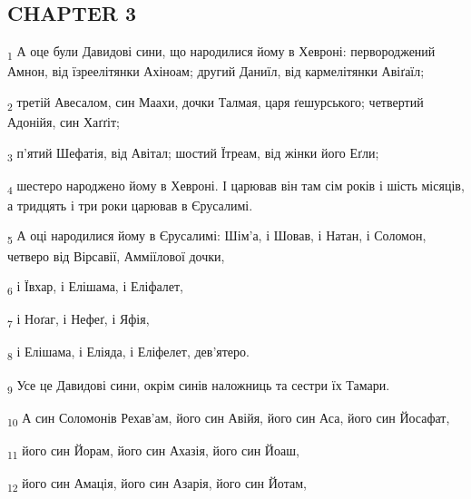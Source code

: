 \subsection{CHAPTER 3}
\begin{tcolorbox}
\textsubscript{1} А оце були Давидові сини, що народилися йому в Хевроні: первороджений Амнон, від їзреелітянки Ахіноам; другий Даниїл, від кармелітянки Авіґаїл;
\end{tcolorbox}
\begin{tcolorbox}
\textsubscript{2} третій Авесалом, син Маахи, дочки Талмая, царя ґешурського; четвертий Адонійя, син Хаґґіт;
\end{tcolorbox}
\begin{tcolorbox}
\textsubscript{3} п'ятий Шефатія, від Авітал; шостий Їтреам, від жінки його Еґли;
\end{tcolorbox}
\begin{tcolorbox}
\textsubscript{4} шестеро народжено йому в Хевроні. І царював він там сім років і шість місяців, а тридцять і три роки царював в Єрусалимі.
\end{tcolorbox}
\begin{tcolorbox}
\textsubscript{5} А оці народилися йому в Єрусалимі: Шім'а, і Шовав, і Натан, і Соломон, четверо від Вірсавії, Амміїлової дочки,
\end{tcolorbox}
\begin{tcolorbox}
\textsubscript{6} і Ївхар, і Елішама, і Еліфалет,
\end{tcolorbox}
\begin{tcolorbox}
\textsubscript{7} і Ноґаг, і Нефеґ, і Яфія,
\end{tcolorbox}
\begin{tcolorbox}
\textsubscript{8} і Елішама, і Еліяда, і Еліфелет, дев'ятеро.
\end{tcolorbox}
\begin{tcolorbox}
\textsubscript{9} Усе це Давидові сини, окрім синів наложниць та сестри їх Тамари.
\end{tcolorbox}
\begin{tcolorbox}
\textsubscript{10} А син Соломонів Рехав'ам, його син Авійя, його син Аса, його син Йосафат,
\end{tcolorbox}
\begin{tcolorbox}
\textsubscript{11} його син Йорам, його син Ахазія, його син Йоаш,
\end{tcolorbox}
\begin{tcolorbox}
\textsubscript{12} його син Амація, його син Азарія, його син Йотам,
\end{tcolorbox}
